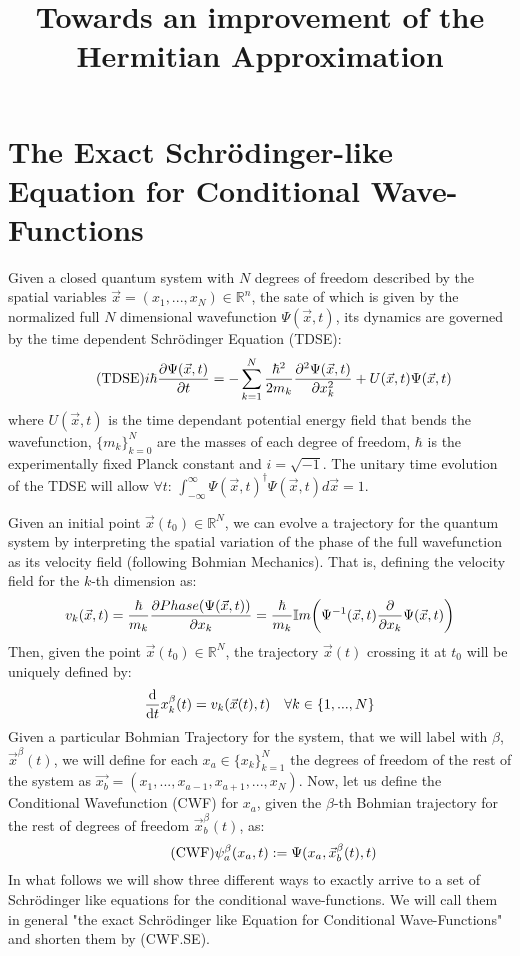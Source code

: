 \documentclass[11pt, a4paper]{article} %
\title{\vspace{-1.0cm} {\bf Towards an improvement of the Hermitian Approximation } \vspace{0.2cm} \\ }
\date{\vspace{-11ex}}
\newcommand{\R}{\mathbb{R}} %
\begin{document}
\maketitle
\tableofcontents

\clearpage
\setcounter{page}{1}
\vspace{-0.3 cm}
\section{The Exact Schrödinger-like Equation for Conditional Wave-Functions}

Given a closed quantum system with $N$ degrees of freedom described by the spatial variables $\vec{x}=(x_1,...,x_N)\in \R^n$, the sate of which is given by the normalized full $N$ dimensional wavefunction $\Psi(\vec{x},t)$, its dynamics are governed by the time dependent Schrödinger Equation (TDSE):
\begin{equation}\label{TDSE}\tag{TDSE}
i\hbar \pdv{\Psi(\vec{x}, t)}{t} = - \sum_{k=1}^{N} \frac{\hbar^2}{2m_k}\pdv[2]{\Psi(\vec{x},t)}{x_k} + U(\vec{x},t)\Psi(\vec{x},t)
\end{equation}
where $U(\vec{x},t)$ is the time dependant potential energy field that bends the wavefunction, $\{m_k\}_{k=0}^N$ are the masses of each degree of freedom, $\hbar$ is the experimentally fixed Planck constant and $i=\sqrt{-1}$. The unitary time evolution of the TDSE will allow $\forall t$: $ \int_{-\infty}^\infty \Psi(\vec{x},t)^\dagger \Psi(\vec{x},t) d\vec{x}=1 $.

Given an initial point $\vec{x}(t_0)\in \R^N$, we can evolve a trajectory for the quantum system by interpreting the spatial variation of the phase of the full wavefunction as its velocity field (following Bohmian Mechanics). That is, defining the velocity field for the $k$-th dimension as:
$$
v_k(\vec{x},t) = \frac{\hbar}{m_k}\pdv{ Phase(\Psi(\vec{x},t))}{x_k}=\frac{\hbar}{m_k}\mathbb{I}m\qty(\Psi^{-1}(\vec{x},t)\pdv{}{x_k}\Psi(\vec{x},t))
$$
Then, given the point $\vec{x}(t_0)\in \R^N$, the trajectory $\vec{x}(t)$ crossing it at $t_0$ will be uniquely defined by:
$$
\dv{}{t}x^\beta_k(t)=v_k(\vec{x}(t),t) \quad \forall k\in \{1,...,N\}\vspace{-0.05 cm}
$$
Given a particular Bohmian Trajectory for the system, that we will label with $\beta$, $\vec{x}^\beta(t)$, we will define for each $x_a\in\{x_k\}_{k=1}^N$ the degrees of freedom of the rest of the system as $\vec{x_b}=(x_1,...,x_{a-1},x_{a+1},...,x_N)$. Now, let us define the Conditional Wavefunction (CWF) for $x_a$, given the $\beta$-th Bohmian trajectory for the rest of degrees of freedom $\vec{x}_b^\beta(t)$, as:
\begin{equation}\label{CWF}\tag{CWF}
\psi_a^\beta(x_a,t) := \Psi(x_a, \vec{x}_b^\beta(t), t)\vspace{-0.05 cm}
\end{equation}
In what follows we will show three different ways to exactly arrive to a set of Schrödinger like equations for the conditional wave-functions. We will call them in general "the exact Schrödinger like Equation for Conditional Wave-Functions" and shorten them by \label{CWF.SE}\hypertarget{CWF.SE}{(CWF.SE)}. \vspace{-0.3 cm}
\end{document}
